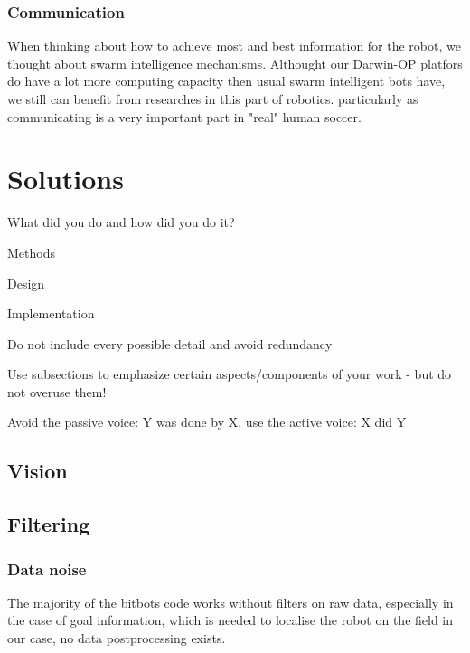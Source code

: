 \documentclass[lnicst,a4paper]{svmultln}
\begin{document}
\subsubsection{Communication}
When thinking about how to achieve most and best information for the robot, we thought about swarm intelligence mechanisms. Althought our Darwin-OP platfors do have a lot more computing capacity then usual swarm intelligent bots have, we still can benefit from researches in this part of robotics. particularly as communicating is a very important part in "real" human soccer.






\section{Solutions}
What did you do and how did you do it?

Methods

Design

Implementation

Do not include every possible detail and avoid redundancy

Use subsections to emphasize certain aspects/components of
your work -
but do not overuse them!

Avoid the passive voice: Y was done by X, use the active voice: X did Y





\subsection{Vision}





\subsection{Filtering}

\subsubsection{Data noise}
The majority of the bitbots code works without filters on raw data, especially in the case of goal information, which is needed to localise the robot on the field in our case, no data postprocessing exists.
\end{document}

